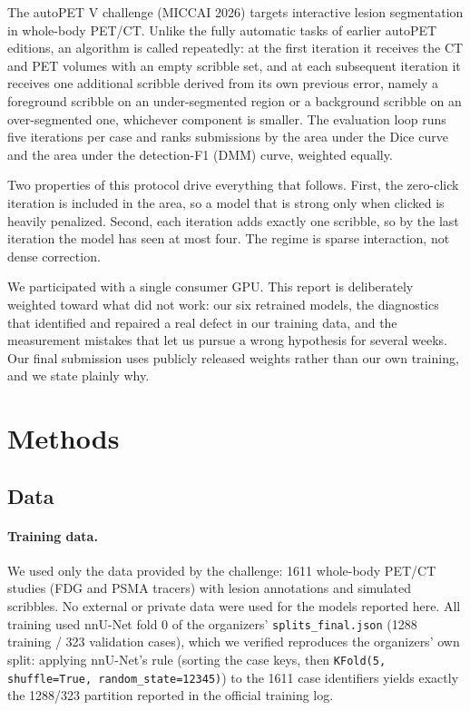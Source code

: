 \documentclass[runningheads]{llncs}
\begin{document}
The autoPET V challenge (MICCAI 2026) targets interactive lesion segmentation
in whole-body PET/CT. Unlike the fully automatic tasks of earlier autoPET
editions, an algorithm is called repeatedly: at the first iteration it receives
the CT and PET volumes with an empty scribble set, and at each subsequent
iteration it receives one additional scribble derived from its own previous
error, namely a foreground scribble on an under-segmented region or a
background scribble on an over-segmented one, whichever component is smaller.
The evaluation loop runs five iterations per case and ranks submissions by the
area under the Dice curve and the area under the detection-F1 (DMM) curve,
weighted equally.

Two properties of this protocol drive everything that follows. First, the
zero-click iteration is included in the area, so a model that is strong only
when clicked is heavily penalized. Second, each iteration adds exactly one
scribble, so by the last iteration the model has seen at most four. The regime
is sparse interaction, not dense correction.

We participated with a single consumer GPU. This report is deliberately
weighted toward what did not work: our six retrained models, the diagnostics
that identified and repaired a real defect in our training data, and the
measurement mistakes that let us pursue a wrong hypothesis for several weeks.
Our final submission uses publicly released weights rather than our own
training, and we state plainly why.

\section{Methods}

\subsection{Data}

\paragraph{Training data.}
We used only the data provided by the challenge: 1611 whole-body PET/CT studies
(FDG and PSMA tracers) with lesion annotations and simulated scribbles. No
external or private data were used for the models reported here. All training
used nnU-Net fold 0 of the organizers' \texttt{splits\_final.json}
(1288 training / 323 validation cases), which we verified reproduces the
organizers' own split: applying nnU-Net's rule (sorting the case keys, then
\texttt{KFold(5, shuffle=True, random\_state=12345)}) to the 1611 case
identifiers yields exactly the 1288/323 partition reported in the official
training log.
\end{document}
